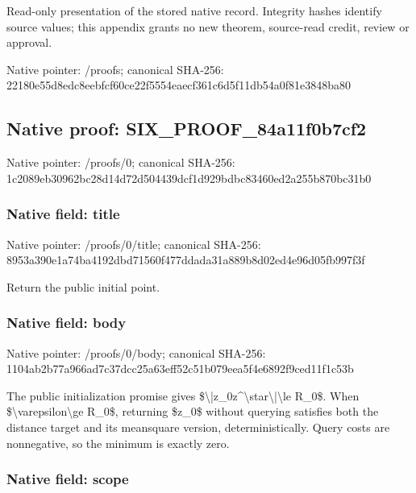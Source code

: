 \documentclass[10pt,a4paper]{article}
\begin{document}
Read-only presentation of the stored native record. Integrity hashes identify source values; this appendix grants no new theorem, source-read credit, review or approval.



Native pointer: /proofs; canonical SHA-256: 22180e55d8edc8eebfcf60ce\allowbreak{}22f5554eaecf361c6d5f11db\allowbreak{}54a0f81e3848ba80



\subsection{Native proof: SIX\_PROOF\_84a11f0b7cf2}


Native pointer: /proofs/0; canonical SHA-256: 1c2089eb30962bc28d14d72d\allowbreak{}504439dcf1d929bdbc83460e\allowbreak{}d2a255b870bc31b0



\subsubsection{Native field: title}


Native pointer: /proofs/0/title; canonical SHA-256: 8953a390e1a74ba4192dbd71\allowbreak{}560f477ddada31a889b8d02e\allowbreak{}d4e96d05fb997f3f


Return the public initial point.


\subsubsection{Native field: body}


Native pointer: /proofs/0/body; canonical SHA-256: 1104ab2b77a966ad7c37dcc2\allowbreak{}5a63eff52c51b079eea5f4e6\allowbreak{}892f9ced11f1c53b


The public initialization promise gives \$\textbackslash{}|z\_0z\textasciicircum{}\textbackslash{}star\textbackslash{}|\textbackslash{}le R\_0\$. When \$\textbackslash{}varepsilon\textbackslash{}ge R\_0\$, returning \$z\_0\$ without querying satisfies both the distance target and its meansquare version, deterministically. Query costs are nonnegative, so the minimum is exactly zero.


\subsubsection{Native field: scope}
\end{document}
